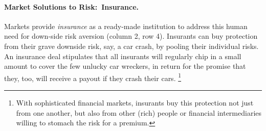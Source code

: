 

\paragraph{Market Solutions to Risk:\ Insurance.}  \label{sec:insurance} Markets provide \emph{insurance} as a ready-made institution to address this human need for down-side risk aversion (column 2, row 4).
Insurants can buy protection from their grave downside risk, say, a car crash, by pooling their individual risks.
An insurance deal stipulates that all insurants will regularly chip in a small amount to cover the few unlucky car wreckers, in return for the promise that they, too, will receive a payout if they crash their cars.
\footnote{
	With sophisticated financial markets, insurants buy this protection not just from one another, but also from other (rich) people or financial intermediaries willing to stomach the risk for a premium.
}

